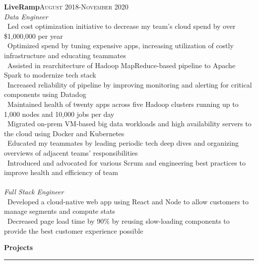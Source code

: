 \documentclass[a4paper,10pt]{article}
\newcommand{\horizontalline}{{\rule{533pt}{0.625pt}\\}}
\renewcommand{\section}[1]{{\noindent\textbf{\large #1}\\\horizontalline}}
\renewcommand{\subsection}[2]{{\noindent \textbf{#1}\hfill \textsc{#2}\\}}
\begin{document}
\subsection{LiveRamp}{August 2018-November 2020}
\textit{Data Engineer}\\
\textbullet\ Led cost optimization initiative to decrease my team's cloud spend by over \$1,000,000 per year\\
\textbullet\ Optimized spend by tuning expensive apps, increasing utilization of costly infrastructure and educating teammates\\
\textbullet\ Assisted in rearchitecture of Hadoop MapReduce-based pipeline to Apache Spark to modernize tech stack\\
\textbullet\ Increased reliability of pipeline by improving monitoring and alerting for critical components using Datadog\\
\textbullet\ Maintained health of twenty apps across five Hadoop clusters running up to 1,000 nodes and 10,000 jobs per day\\
\textbullet\ Migrated on-prem VM-based big data workloads and high availability servers to the cloud using Docker and Kubernetes\\
\textbullet\ Educated my teammates by leading periodic tech deep dives and organizing overviews of adjacent teams' responsibilities\\
\textbullet\ Introduced and advocated for various Scrum and engineering best practices to improve health and efficiency of team\\ \\
\textit{Full Stack Engineer}\\
\textbullet\ Developed a cloud-native web app using React and Node to allow customers to manage segments and compute stats\\
\textbullet\ Decreased page load time by 90\% by reusing slow-loading components to provide the best customer experience possible\\

\section{Projects}
\end{document}
